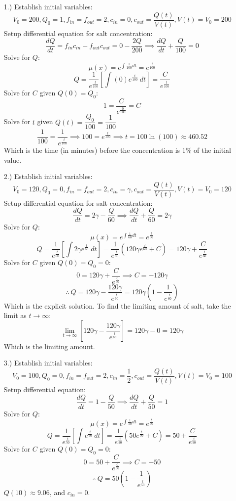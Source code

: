\documentclass[12pt]{article}
\newcommand{\bracks}[1]{\left[#1\right]}
\begin{document}
\pagestyle{fancy}
\fancyhead{}

\begin{itemize}
    \item [1.)] Establish initial variables:
    \[V_0=200,Q_0=1,f_{in}=f_{out}=2,c_{in}=0,c_{out}=\frac{Q(t)}{V(t)},V(t)=V_0=200\]
    Setup differential equation for salt concentration:
    \[\frac{dQ}{dt}=f_{in}c_{in}-f_{out}c_{out}=0-\frac{2Q}{200}\implies\frac{dQ}{dt}+\frac{Q}{100}=0\]
    Solve for $Q$:
    \[\mu(x)=e^{\int\frac{1}{100}dt}=e^{\frac{t}{100}}\]
    \[Q=\frac{1}{e^{\frac{t}{100}}}\bracks{\int(0)e^{\frac{t}{100}}\ dt}=\frac{C}{e^{\frac{t}{100}}}\]
    Solve for $C$ given $Q(0)=Q_0$:
    \[1=\frac{C}{e^{\frac{0}{100}}}=C\]
    Solve for $t$ given $Q(t)=\dfrac{Q_0}{100}=\dfrac{1}{100}$
    \[\frac{1}{100}=\frac{1}{e^\frac{t}{100}}\implies100=e^\frac{t}{100}\implies t=100\ln(100)\approx460.52\]
    Which is the time (in minutes) before the concentration is $1\%$ of the initial value.

    \item [2.)] Establish initial variables:
    \[V_0=120,Q_0=0,f_{in}=f_{out}=2,c_{in}=\gamma,c_{out}=\frac{Q(t)}{V(t)},V(t)=V_0=120\]
    Setup differential equation for salt concentration:
    \[\frac{dQ}{dt}=2\gamma-\frac{Q}{60}\implies\frac{dQ}{dt}+\frac{Q}{60}=2\gamma\]
    Solve for $Q$:
    \[\mu(x)=e^{\int\frac{1}{60}dt}=e^\frac{t}{60}\]
    \[Q=\frac{1}{e^\frac{t}{60}}\bracks{\int2\gamma e^\frac{t}{60}\ dt}=\frac{1}{e^\frac{t}{60}}\left(120\gamma e^\frac{t}{60}+C\right)=120\gamma+\frac{C}{e^\frac{t}{60}}\]
    Solve for $C$ given $Q(0)=Q_0=0$:
    \[0=120\gamma+\frac{C}{e^\frac{0}{60}}\implies C=-120\gamma\]
    \[\therefore\ Q=120\gamma-\frac{120\gamma}{e^\frac{t}{60}}=120\gamma\left(1-\frac{1}{e^\frac{t}{60}}\right)\]
    Which is the explicit solution. To find the limiting amount of salt, take the limit as $t\rightarrow\infty$:
    \[\lim_{t\rightarrow\infty}\bracks{120\gamma-\frac{120\gamma}{e^\frac{t}{60}}}=120\gamma-0=120\gamma\]
    Which is the limiting amount.

    \pagebreak
    \item [3.)] Establish initial variables:
    \[V_0=100,Q_0=0,f_{in}=f_{out}=2,c_{in}=\frac{1}{2},c_{out}=\frac{Q(t)}{V(t)},V(t)=V_0=100\]
    Setup differential equation:
    \[\frac{dQ}{dt}=1-\frac{Q}{50}\implies\frac{dQ}{dt}+\frac{Q}{50}=1\]
    Solve for $Q$:
    \[\mu(x)=e^{\int\frac{1}{50}dt}=e^\frac{t}{50}\]
    \[Q=\frac{1}{e^\frac{t}{50}}\bracks{\int e^\frac{t}{50}\ dt}=\frac{1}{e^\frac{t}{50}}\left(50e^\frac{t}{50}+C\right)=50+\frac{C}{e^\frac{t}{50}}\]
    Solve for $C$ given $Q(0)=Q_0=0$:
    \[0=50+\frac{C}{e^\frac{0}{50}}\implies C=-50\]
    \[\therefore\ Q=50\left(1-\frac{1}{e^\frac{t}{50}}\right)\]
    $Q(10)\approx9.06$, and $c_{in}=0$.
\end{itemize}
\end{document}
